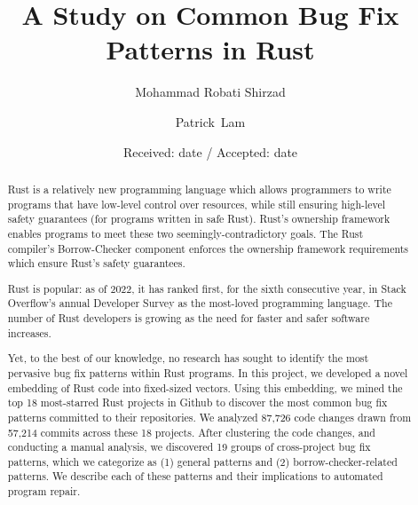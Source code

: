 \documentclass[smallextended]{svjour3}       %
\begin{document}
\title{A Study on Common Bug Fix Patterns in Rust%
}
\subtitle{}


\author{Mohammad Robati Shirzad         \and
        Patrick~Lam %
}



\date{Received: date / Accepted: date}


\maketitle

\begin{abstract}
    Rust is a relatively new programming language which allows programmers to write programs that have low-level control over resources, while still ensuring high-level safety guarantees (for programs written in safe Rust). Rust's ownership framework enables programs to meet these two seemingly-contradictory goals. The Rust compiler's Borrow-Checker component enforces the ownership framework requirements which ensure Rust's safety guarantees.

Rust is popular: as of 2022, it has ranked first, for the sixth consecutive year, in Stack Overflow's annual Developer Survey as the most-loved programming language. The number of Rust developers is growing as the need for faster and safer software increases. 

Yet, to the best of our knowledge, no research has sought to identify the most pervasive bug fix patterns within Rust programs. In this project, we developed a novel embedding of Rust code into fixed-sized vectors. Using this embedding, we mined the top 18 most-starred Rust projects in Github to discover the most common bug fix patterns committed to their repositories. We analyzed 87,726 code changes drawn from 57,214 commits across these 18 projects. After clustering the code changes, and conducting a manual analysis, we discovered 19 groups of cross-project bug fix patterns, which we categorize as (1) general patterns and (2) borrow-checker-related patterns. We describe each of these patterns and their implications to automated program repair.
\end{abstract}
\end{document}
